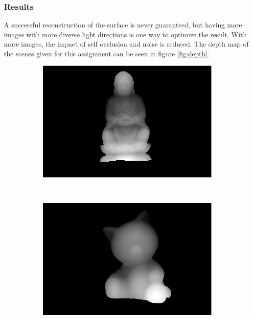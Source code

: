 \documentclass{paper}
\begin{document}
\subsubsection{Results}
A successful reconstruction of the surface is never guaranteed, but having more images with 
more diverse light directions is one way to optimize the result. With more images,
the impact of self occlusion and noise is reduced. The depth map of the scenes
given for this assignment can be seen in figure \ref{fig:depth}.
\begin{figure}[h!]
        \centering
        \begin{subfigure}{0.3\textwidth}
                \includegraphics[width=\textwidth]{report_fig/buddha_d}
        \end{subfigure}
        ~ 
        \begin{subfigure}{0.3\textwidth}
                \includegraphics[width=\textwidth]{report_fig/cat_d}

\end{subfigure}
\end{figure}
\end{document}

